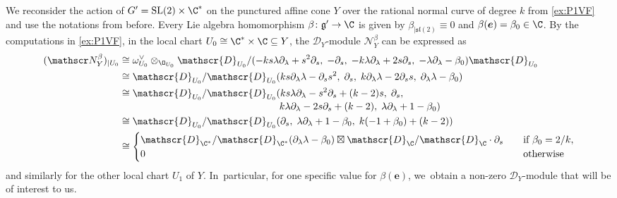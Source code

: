 \documentclass[JEP,XML,SOM,Unicode,published]{cedram}
\newcommand{\bme}{{\boldsymbol{e}}}
\newcommand{\frg}{\mathfrak{g}}
\newcommand{\fsl}{\mathfrak{sl}}
\DeclareMathOperator{\SL}{\textup{SL}}
\newcommand\restr[2]{{#1_{| {#2}}}}
\newcommand\restrK[2]{{(#1)_{| {#2}}}}
\begin{document}
\begin{exa} \label{ex:P1NBeta}
We reconsider the action of $G' = \SL(2) \times \C^*$ on the punctured affine cone $Y$ over the rational normal curve of degree $k$ from \cref{ex:P1VF} and use the notations from before. Every Lie algebra homomorphism $\beta \colon \frg' \to \C$ is given by $\restr{\beta}{\fsl(2)} \equiv 0$ and $\beta(\bme) = \beta_0 \in \C$. By the computations in \cref{ex:P1VF}, in the local chart $U_0 \cong \C^* \times \C \subseteq Y$, the $\mathscr D_Y$\nobreakdash-mod\-ule $\mathscr{N}_Y^\beta$ can be expressed as
\begin{align*}
\restrK{\mathscr N_Y^\beta}{U_0} &\cong
\omega_{U_0}^\vee \otimes_{\O_{U_0}} \mathscr{D}_{U_0}/(
-ks \lambda \partial_\lambda + s^2 \partial_s, \;
-\partial_s, \;
-k \lambda \partial_\lambda + 2 s \partial_s, \;
-\lambda \partial_\lambda - \beta_0)\mathscr{D}_{U_0} \\
&\cong \mathscr{D}_{U_0}/\mathscr{D}_{U_0}(
ks \partial_\lambda \lambda - \partial_s s^2, \;
\partial_s, \;
k \partial_\lambda \lambda - 2 \partial_s s, \;
\partial_\lambda \lambda - \beta_0) \\
&\cong \mathscr{D}_{U_0}/\mathscr{D}_{U_0}(
ks \lambda \partial_\lambda - s^2 \partial_s + (k-2)s, \;
\partial_s, \\[-3pt]
& \hspace*{5.7cm} k \lambda \partial_\lambda - 2 s \partial_s + (k-2), \;
\lambda \partial_\lambda + 1 - \beta_0) \\
&\cong \mathscr{D}_{U_0}/\mathscr{D}_{U_0}(
\partial_s, \;
\lambda \partial_\lambda + 1 - \beta_0, \; k(-1+\beta_0)+(k-2)) \\
&\cong
\begin{cases}
\mathscr{D}_{\C^*}/\mathscr{D}_{\C^*}(\partial_\lambda \lambda - \beta_0) \boxtimes \mathscr{D}_{\C}/\mathscr{D}_{\C} \cdot \partial_s
\quad &\text{if } \beta_0 = 2/k, \\
0 &\text{otherwise}
\end{cases}
\end{align*}
and similarly for the other local chart $U_1$ of $Y$. In~particular, for one specific value for $\beta(\bme)$, we~obtain a non-zero $\mathscr D_Y$\nobreakdash-mod\-ule that will be of interest to us.


\end{exa}
\end{document}
